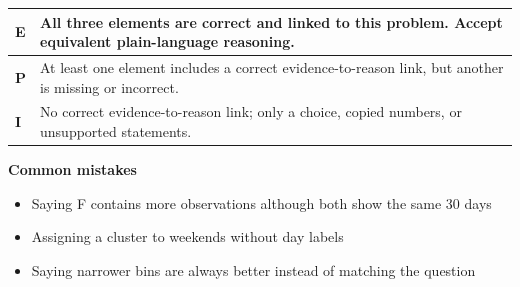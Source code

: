 \documentclass[11pt]{article}
\begin{document}
{\small\renewcommand{\arraystretch}{1.25}
\noindent\begin{tabular}{|p{0.5in}|p{5.9in}|}
\hline
\textbf{E} & All three elements are correct and linked to this problem. Accept equivalent plain-language reasoning. \\ \hline
\textbf{P} & At least one element includes a correct evidence-to-reason link, but another is missing or incorrect. \\ \hline
\textbf{I} & No correct evidence-to-reason link; only a choice, copied numbers, or unsupported statements. \\ \hline
\end{tabular}}

\textbf{Common mistakes}
\begin{itemize}[leftmargin=1.5em,itemsep=2pt,topsep=2pt]
  \item Saying F contains more observations although both show the same 30 days
  \item Assigning a cluster to weekends without day labels
  \item Saying narrower bins are always better instead of matching the question
\end{itemize}

\clearpage
{}
\end{document}
